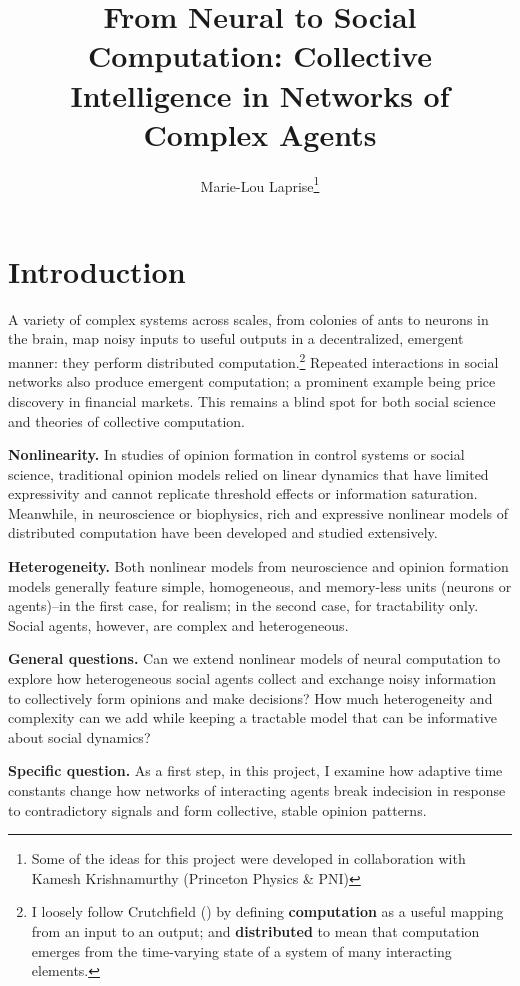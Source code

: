 \documentclass[]{article}
\title{From Neural to Social Computation: Collective Intelligence in Networks of Complex Agents}
\author{Marie-Lou Laprise\footnote{Some of the ideas for this project were developed in collaboration with Kamesh Krishnamurthy (Princeton Physics \& PNI)}}
\begin{document}
	
	\maketitle
\section{Introduction}


A variety of complex systems across scales, from colonies of ants to neurons in the brain, map noisy inputs to useful outputs in a decentralized, emergent manner: they perform distributed computation.\footnote{ I loosely follow Crutchfield (\cite{crutchfieldCalculiEmergenceComputation1994}) by defining \textbf{computation} as a useful mapping from an input to an output; and \textbf{distributed} to mean that computation emerges from the time-varying state of a system of many interacting elements.} Repeated interactions in social networks also produce emergent computation; a prominent example being price discovery in financial markets. This remains a blind spot for both social science and theories of collective computation. 

\textbf{Nonlinearity.} In studies of opinion formation in control systems or social science, traditional opinion models relied on linear dynamics that have limited expressivity and cannot replicate threshold effects or information saturation. Meanwhile, in neuroscience or biophysics, rich and expressive nonlinear models of distributed computation have been developed and studied extensively.

\textbf{Heterogeneity.} Both nonlinear models from neuroscience and opinion formation models generally feature simple, homogeneous, and memory-less units (neurons or agents)--in the first case, for realism; in the second case, for tractability only. Social agents, however, are complex and heterogeneous. 

\textbf{General questions.} Can we extend nonlinear models of neural computation to explore how heterogeneous social agents collect and exchange noisy information to collectively form opinions and make decisions? How much heterogeneity and complexity can we add while keeping a tractable model that can be informative about social dynamics?

\textbf{Specific question.} As a first step, in this project, I examine how adaptive time constants change how networks of interacting agents break indecision in response to contradictory signals and form collective, stable opinion patterns.
\end{document}
